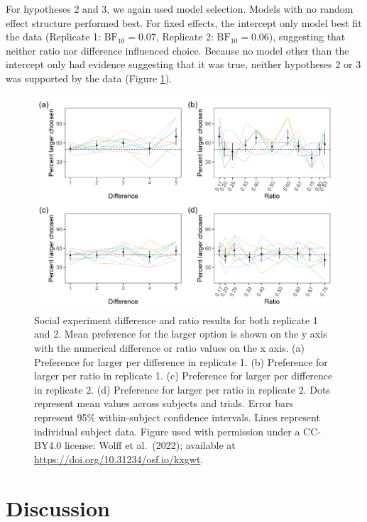 \documentclass[
  ,doc,floatsintext]{apa6}
\begin{document}
For hypotheses 2 and 3, we again used model selection. Models with no random effect structure performed best. For fixed effects, the intercept only model best fit the data (Replicate 1: \(\mathrm{BF}_{\textrm{10}} = 0.07\), Replicate 2: \(\mathrm{BF}_{\textrm{10}} = 0.06\)), suggesting that neither ratio nor difference influenced choice. Because no model other than the intercept only had evidence suggesting that it was true, neither hypotheses 2 or 3 was supported by the data (Figure \ref{fig:socialgraphs}).



\begin{figure}

{\centering \includegraphics[width=1\linewidth]{../figures/social_figure} 

}

\caption{Social experiment difference and ratio results for both replicate 1 and 2. Mean preference for the larger option is shown on the y axis with the numerical difference or ratio values on the x axis. (a) Preference for larger per difference in replicate 1. (b) Preference for larger per ratio in replicate 1. (c) Preference for larger per difference in replicate 2. (d) Preference for larger per ratio in replicate 2. Dots represent mean values across subjects and trials. Error bars represent 95\% within-subject confidence intervals. Lines represent individual subject data. Figure used with permission under a CC-BY4.0 license: Wolff et al.~(2022); available at \url{https://doi.org/10.31234/osf.io/kxgwt}.}\label{fig:socialgraphs}
\end{figure}

\hypertarget{discussion}{%
\section{Discussion}\label{discussion}}
\end{document}
